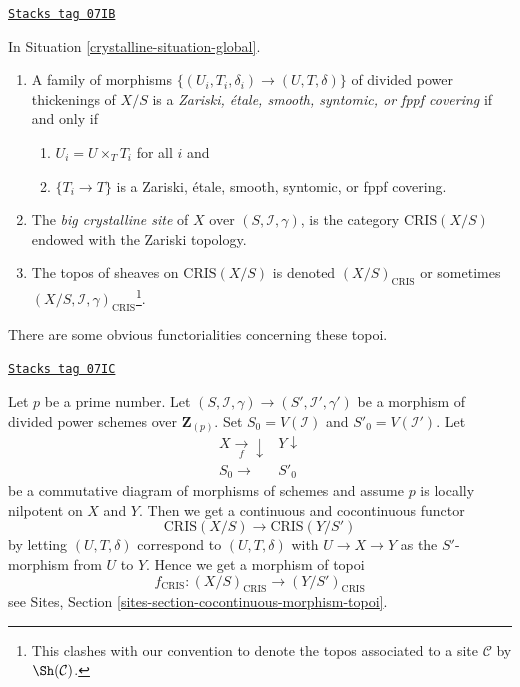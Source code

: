\begin{definition}
\label{crystalline-definition-big-crystalline-site}
\href{https://stacks.math.columbia.edu/tag/07IB}{\texttt{Stacks tag 07IB}}

In Situation \ref{crystalline-situation-global}.
\begin{enumerate}
\item A family of morphisms $\{(U_i, T_i, \delta_i) \to (U, T, \delta)\}$
of divided power thickenings of $X/S$ is a
{\it Zariski, \'etale, smooth, syntomic, or fppf covering}
if and only if
\begin{enumerate}
\item $U_i = U \times_T T_i$ for all $i$ and
\item $\{T_i \to T\}$ is a Zariski, \'etale, smooth, syntomic, or fppf covering.
\end{enumerate}
\item The {\it big crystalline site} of $X$ over $(S, \mathcal{I}, \gamma)$,
is the category $\text{CRIS}(X/S)$ endowed with the Zariski topology.
\item The topos of sheaves on $\text{CRIS}(X/S)$ is denoted
$(X/S)_{\text{CRIS}}$ or sometimes
$(X/S, \mathcal{I}, \gamma)_{\text{CRIS}}$\footnote{This clashes with
our convention to denote the topos associated to a site $\mathcal{C}$
by $\Sh(\mathcal{C})$.}.
\end{enumerate}
\end{definition}

There are some obvious functorialities concerning these topoi.

\begin{remark}[Functoriality]

\label{crystalline-remark-functoriality-big-cris}
\href{https://stacks.math.columbia.edu/tag/07IC}{\texttt{Stacks tag 07IC}}

Let $p$ be a prime number.
Let $(S, \mathcal{I}, \gamma) \to (S', \mathcal{I}', \gamma')$ be a
morphism of divided power schemes over $\mathbf{Z}_{(p)}$.
Set $S_0 = V(\mathcal{I})$ and $S'_0 = V(\mathcal{I}')$.
Let
$$
\begin{array}{cc}X \underset{f}{\longrightarrow}\downarrow & Y \downarrow \\ S_0 \longrightarrow & S'_0\end{array}
$$
be a commutative diagram of morphisms of schemes and assume $p$ is
locally nilpotent on $X$ and $Y$. Then we get a continuous and
cocontinuous functor
$$
\text{CRIS}(X/S) \longrightarrow \text{CRIS}(Y/S')
$$
by letting $(U, T, \delta)$ correspond to $(U, T, \delta)$
with $U \to X \to Y$ as the $S'$-morphism from $U$ to $Y$.
Hence we get a morphism of topoi
$$
f_{\text{CRIS}} : (X/S)_{\text{CRIS}} \longrightarrow (Y/S')_{\text{CRIS}}
$$
see Sites, Section \ref{sites-section-cocontinuous-morphism-topoi}.
\end{remark}

